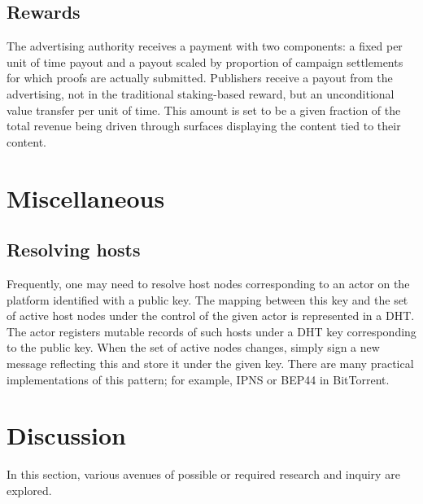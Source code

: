 \documentclass{article}
\begin{document}
\subsection{Rewards}

The advertising authority receives a payment with two components: a fixed per unit of time payout and a payout scaled by proportion of campaign settlements for which proofs are actually submitted. Publishers receive a payout from the advertising, not in the traditional staking-based reward, but an unconditional value transfer per unit of time. This amount is set to be a given fraction of the total revenue being driven through surfaces displaying the content tied to their content.


\section{Miscellaneous}

\subsection{Resolving hosts}

Frequently, one may need to resolve host nodes corresponding to an actor on the platform identified with a public key. The mapping between this key and the set of active host nodes under the control of the given actor is represented in a DHT. The actor registers mutable records of such hosts under a DHT key corresponding to the public key. When the set of active nodes changes, simply sign a new message reflecting this and store it under the given key. There are many practical implementations of this pattern; for example, IPNS or BEP44 in BitTorrent.

\section{Discussion} \label{sec:discussion}

In this section, various avenues of possible or required research and inquiry are explored.
\end{document}
